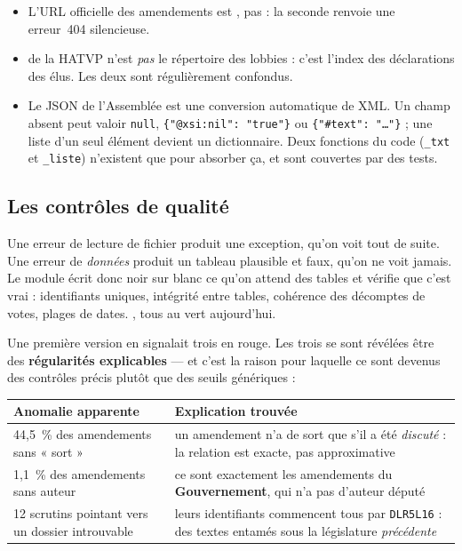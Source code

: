 \documentclass[11pt,a4paper]{article}
\begin{document}
\begin{alerte}
\begin{itemize}
\item L'URL officielle des amendements est , pas
   : la seconde renvoie une erreur~404 silencieuse.
\item {} de la HATVP n'est \emph{pas} le répertoire des lobbies : c'est
  l'index des déclarations des élus. Les deux sont régulièrement confondus.
\item Le JSON de l'Assemblée est une conversion automatique de XML. Un champ absent peut
  valoir \texttt{null}, \texttt{\{"@xsi:nil": "true"\}} ou \texttt{\{"\#text": "…"\}} ; une
  liste d'un seul élément devient un dictionnaire. Deux fonctions du code
  (\texttt{\_txt} et \texttt{\_liste}) n'existent que pour absorber ça, et sont couvertes
  par des tests.
\end{itemize}
\end{alerte}

\subsection{Les contrôles de qualité}

Une erreur de lecture de fichier produit une exception, qu'on voit tout de suite. Une
erreur de \emph{données} produit un tableau plausible et faux, qu'on ne voit jamais. Le
module  écrit donc noir sur blanc ce qu'on attend des tables et
vérifie que c'est vrai : identifiants uniques, intégrité entre tables, cohérence des
décomptes de votes, plages de dates. , tous au vert aujourd'hui.

Une première version en signalait trois en rouge. Les trois se sont révélées être des
\textbf{régularités explicables} --- et c'est la raison pour laquelle ce sont devenus des
contrôles précis plutôt que des seuils génériques :

\begin{center}
\small
\begin{tabular}{@{}p{}p{}@{}}
\toprule
\textbf{Anomalie apparente} & \textbf{Explication trouvée} \\
\midrule
44,5~\% des amendements sans « sort » & un amendement n'a de sort que s'il a été
\emph{discuté} : la relation est exacte, pas approximative \\
1,1~\% des amendements sans auteur & ce sont exactement les amendements du
\textbf{Gouvernement}, qui n'a pas d'auteur député \\
12 scrutins pointant vers un dossier introuvable & leurs identifiants commencent tous par
\texttt{DLR5L16} : des textes entamés sous la législature \emph{précédente} \\
\bottomrule
\end{tabular}
\end{center}
\end{document}
